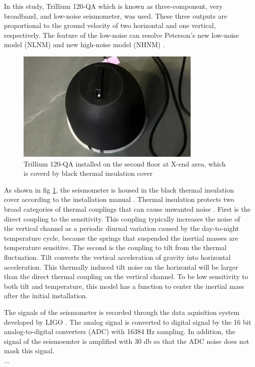 In this study, Trillium 120-QA which is known as three-component, very broadband, and low-noise seismometer, was used. These three outputs are proportional to the ground velocity of two horizontal and one vertical, respectively. The feature of the low-noise can resolve  Peterson's new low-noise model (NLNM) and new high-noise model (NHNM) \cite{peterson1993observations}.

\begin{figure}[H]
  \begin{center}   
    \includegraphics[width=9.0cm]{./img_chap3/img316.png}
    \caption{Trillium 120-QA installed on the second floor at X-end area, which is coverd by black thermal insulation cover}\label{img:img316}
  \end{center}
\end{figure}

As shown in fig \ref{img:img316}, the seismometer is housed in the black thermal insulation cover according to the installation manual \cite{trillium120manual}. Thermal insulation protects two broad categories of thermal couplings that can cause unwanted noise \cite{trillium120manual}. First is the direct coupling to the sensitivity. This coupling typically increases the noise of the vertical channel as a periodic diurnal variation caused by the day-to-night temperature cycle, because the springs that suspended the inertial masses are temperature sensitive. The second is the coupling to tilt from the thermal fluctuation. Tilt converts the vertical acceleration of gravity into horizontal acceleration. This thermally induced tilt noise on the horizontal will be larger than the direct thermal coupling on the vertical channel. To be low sensitivity to both tilt and temperature, this model has a function to center the inertial mass after the initial installation.

The signals of the seismometer is recorded through the data aquisition system developed by LIGO \cite{bork2001overview}. The analog signal is converted to digital signal by the 16 bit analog-to-digital converters (ADC) with 16384 $\mathrm{Hz}$ sampling. In addition, the signal of the seismoemter is amplified with 30 db so that the ADC noise does not mask this signal.\\
...


